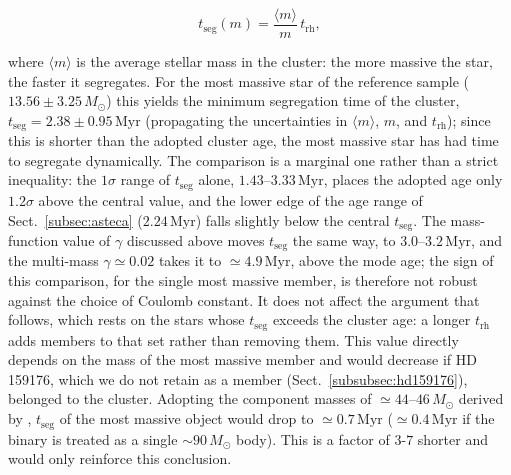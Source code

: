 \documentclass{aa}
\begin{document}
\begin{equation}\label{eq:tseg}
t_{\mathrm{seg}}(m) = \frac{\langle m \rangle}{m}\, t_{\mathrm{rh}},
\end{equation}

where $\langle m \rangle$ is the average stellar mass in the cluster: the more massive the star, the faster it segregates. For the most massive star of the reference sample ($13.56 \pm 3.25\,M_\odot$) this yields the minimum segregation time of the cluster, $t_{\mathrm{seg}} = 2.38 \pm 0.95\,\mathrm{Myr}$ (propagating the uncertainties in $\langle m \rangle$, $m$, and $t_{\mathrm{rh}}$); since this is shorter than the adopted cluster age, the most massive star has had time to segregate dynamically. The comparison is a marginal one rather than a strict inequality: the $1\sigma$ range of $t_{\mathrm{seg}}$ alone, $1.43$--$3.33\,\mathrm{Myr}$, places the adopted age only $1.2\sigma$ above the central value, and the lower edge of the age range of Sect.~\ref{subsec:asteca} ($2.24\,\mathrm{Myr}$) falls slightly below the central $t_{\mathrm{seg}}$. The mass-function value of $\gamma$ discussed above moves $t_{\mathrm{seg}}$ the same way, to $3.0$--$3.2\,\mathrm{Myr}$, and the multi-mass $\gamma\simeq0.02$ takes it to $\simeq4.9\,\mathrm{Myr}$, above the mode age; the sign of this comparison, for the single most massive member, is therefore not robust against the choice of Coulomb constant. It does not affect the argument that follows, which rests on the stars whose $t_{\mathrm{seg}}$ exceeds the cluster age: a longer $t_{\mathrm{rh}}$ adds members to that set rather than removing them. This value directly depends on the mass of the most massive member and would decrease if HD 159176, which we do not retain as a member (Sect.~\ref{subsubsec:hd159176}), belonged to the cluster. Adopting the component masses of $\simeq44$--$46\,M_\odot$ derived by \citet{2016ApJ...832..211P}, $t_{\mathrm{seg}}$ of the most massive object would drop to $\simeq0.7\,\mathrm{Myr}$ ($\simeq0.4\,\mathrm{Myr}$ if the binary is treated as a single $\sim90\,M_\odot$ body). This is a factor of $3$-$7$ shorter and would only reinforce this conclusion.
\end{document}
